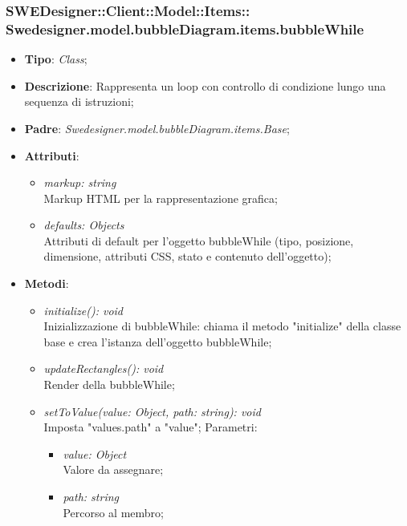 \documentclass[../DefinizioneDiProdotto.tex]{subfiles}
\begin{document}
			\subsubsection[Swedesigner.model.bubbleDiagram.items.bubbleWhile]{SWEDesigner::Client::Model::Items::\\Swedesigner.model.bubbleDiagram.items.bubbleWhile}
			\hypertarget{SWEDesigner::Client::Model::Items::Swedesigner.model.bubbleDiagram.items.bubbleWhile}{}
			\begin{itemize}
				\item \textbf{Tipo}: \emph{Class};
				\item \textbf{Descrizione}: Rappresenta un loop con controllo di condizione lungo una sequenza di istruzioni;
				\item \textbf{Padre}: \emph{Swedesigner.model.bubbleDiagram.items.Base};
				\item \textbf{Attributi}:
				\begin{itemize}
					\item \emph{markup: string}\\
					Markup HTML per la rappresentazione grafica;
					\item \emph{defaults: Objects}\\
					Attributi di default per l'oggetto bubbleWhile (tipo, posizione, dimensione, attributi CSS, stato e contenuto dell'oggetto);
				\end{itemize}
				\item \textbf{Metodi}:
				\begin{itemize}
					\item \emph{initialize(): void}\\
					Inizializzazione di bubbleWhile: chiama il metodo "initialize" della classe base e crea l'istanza dell'oggetto bubbleWhile;
					\item \emph{updateRectangles(): void}\\
					Render della bubbleWhile;
					\item \emph{setToValue(value: Object, path: string): void}\\
					Imposta "values.path" a "value";
					Parametri:
					\begin{itemize}
						\item \emph{value: Object} \\
						Valore da assegnare;
						\item \emph{path: string} \\
						Percorso al membro;
					\end{itemize}
				\end{itemize}
			\end{itemize}
			
\end{document}
